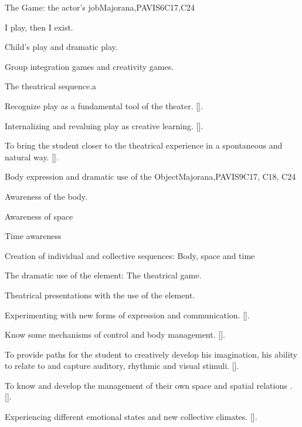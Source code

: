\begin{syllabus}
\begin{unit}{}{The Game: the actor's job}{Majorana,PAVIS}{6}{C17,C24}
\begin{topics}
	\item I play, then I exist.
	\item Child's play and dramatic play.
	\item Group integration games and creativity games.
	\item The theatrical sequence.a
\end{topics}
\begin{learningoutcomes}
	\item Recognize play as a fundamental tool of the theater. [\Usage].
	\item Internalizing and revaluing play as creative learning. [\Usage].
	\item To bring the student closer to the theatrical experience in a spontaneous and natural way. [\Usage].
\end{learningoutcomes}
\end{unit}

\begin{unit}{}{Body expression and dramatic use of the Object}{Majorana,PAVIS}{9}{C17, C18, C24}
\begin{topics}
	\item Awareness of the body.
	\item Awareness of space
	\item Time awareness
	\item Creation of individual and collective sequences: Body, space and time
	\item The dramatic use of the element: The theatrical game.
	\item Theatrical presentations with the use of the element.

\end{topics}
\begin{learningoutcomes}
	\item Experimenting with new forms of expression and communication. [\Usage].
	\item Know some mechanisms of control and body management. [\Usage].
	\item To provide paths for the student to creatively develop his imagination, his ability to relate to and capture auditory, rhythmic and visual stimuli. [\Usage].
	\item To know and develop the management of their own space and spatial relations . [\Usage].
	\item Experiencing different emotional states and new collective climates. [\Usage].
\end{learningoutcomes}
\end{unit}


\end{syllabus}
